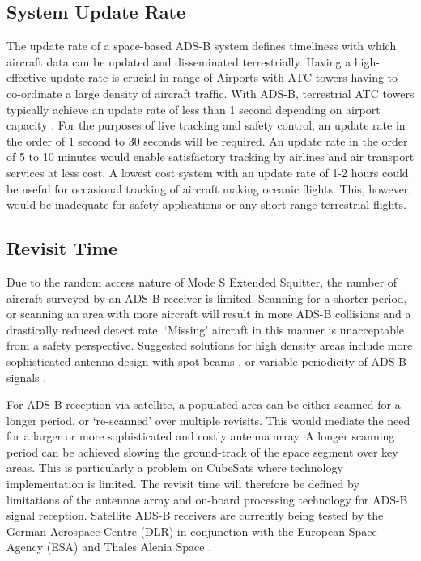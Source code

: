 \subsection{System Update Rate}
The update rate of a space-based ADS-B system defines timeliness with which aircraft data can be updated and disseminated terrestrially. Having a high-effective update rate is crucial in range of Airports with ATC towers having to co-ordinate a large density of aircraft traffic. With ADS-B, terrestrial ATC towers typically achieve an update rate of less than 1 second depending on airport capacity \cite{Orlando2001}. For the purposes of live tracking and safety control, an update rate in the order of 1 second to 30 seconds will be required. An update rate in the order of 5 to 10 minutes would enable satisfactory tracking by airlines and air transport services at less cost. A lowest cost system with an update rate of 1-2 hours could be useful for occasional tracking of aircraft making oceanic flights. This, however, would be inadequate for safety applications or any short-range terrestrial flights. 

\subsection{Revisit Time}
Due to the random access nature of Mode S Extended Squitter, the number of aircraft surveyed by an ADS-B receiver is limited. Scanning for a shorter period, or scanning an area with more aircraft will result in more ADS-B collisions and a drastically reduced detect rate. `Missing' aircraft in this manner is unacceptable from a safety perspective. Suggested solutions for high density areas include more sophisticated antenna design with spot beams \cite{Blomenhofer2012}, or variable-periodicity of ADS-B signals \cite{Orlando2001}. 

For ADS-B reception via satellite, a populated area can be either scanned for a longer period, or `re-scanned' over multiple revisits. This would mediate the need for a larger or more sophisticated and costly antenna array. A longer scanning period can be achieved slowing the ground-track of the space segment over key areas. This is particularly a problem on CubeSats where technology implementation is limited. The revisit time will therefore be defined by limitations of the antennae array and on-board processing technology for ADS-B signal reception. Satellite ADS-B receivers are currently being tested by the German Aerospace Centre (DLR) in conjunction with the European Space Agency (ESA) \cite{DLR} and Thales Alenia Space \cite{Blomenhofer2012}.

